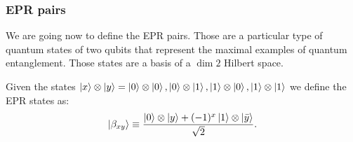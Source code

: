 \subsubsection{EPR pairs}
We are going now to define the EPR pairs. Those are a particular type of quantum states of two qubits that represent the maximal examples of quantum entanglement. Those states are a basis of a $\dim{2}$ Hilbert space.

Given the states $\ket{x} \otimes \ket{y} = \ket{0} \otimes \ket{0}, \ket{0} \otimes \ket{1}, \ket{1} \otimes \ket{0}, \ket{1} \otimes \ket{1}$ we define the EPR states as:
\begin{equation}
    \ket{\beta_{x y}} \equiv \frac{\ket{0} \otimes \ket{y} +(-1)^{x} \ket{1} \otimes \ket{\bar{y}}}{\sqrt{2}}.
\end{equation}